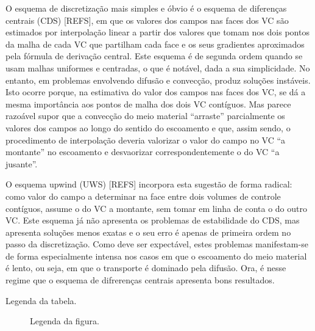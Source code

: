 \documentclass[11pt,twoside]{article}
\begin{document}
{O esquema de discretização mais simples e óbvio é o esquema de diferenças
centrais (CDS) [REFS], em que os valores dos campos nas faces dos VC são
estimados por interpolação linear a partir dos valores que tomam nos dois pontos
da malha de cada VC que partilham cada face e os seus gradientes aproximados
pela fórmula de derivação central. Este esquema é de segunda ordem quando se
usam malhas uniformes e centradas, o que é notável, dada a sua simplicidade. No
entanto, em problemas envolvendo difusão e convecção, produz soluções instáveis.
Isto ocorre porque, na estimativa do valor dos campos nas faces dos VC, se dá a
mesma importância aos pontos de malha dos dois VC contíguos.  Mas parece
razoável supor que a convecção do meio material ``arraste'' parcialmente os
valores dos campos ao longo do sentido do escoamento e que, assim sendo, o
procedimento de interpolação deveria valorizar o valor do campo no VC ``a
montante'' no escoamento e desvaorizar correspondentemente o do VC ``a
jusante''.

O esquema upwind (UWS) [REFS] incorpora esta sugestão de forma radical: como
valor do campo a determinar na face entre dois volumes de controle contíguos,
assume o do VC a montante, sem tomar em linha de conta o do outro VC. Este
esquema já não apresenta os problemas de estabilidade do CDS, mas apresenta
soluções menos exatas e o seu erro é apenas de primeira ordem no passo da
discretização. Como deve ser expectável, estes problemas manifestam-se de forma
especialmente intensa nos casos em que o escoamento do meio material é lento, ou
seja, em que o transporte é dominado pela difusão. Ora, é nesse regime que o
esquema de difrerenças centrais apresenta bons resultados.





\begin{table}[!h]
\caption{Legenda da tabela.}

\end{table}



\begin{figure}[!h]
\centering
\caption{Legenda da figura.}
\end{figure}








}
\end{document}
